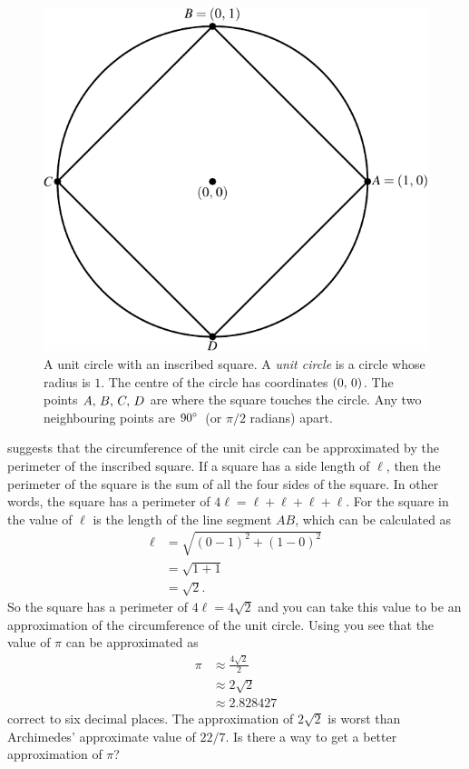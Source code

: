 \documentclass[a4paper,oneside,12pt]{article}
\begin{document}
\begin{figure}[!htbp]
\centering
\includegraphics[scale=1.1]{image/05/circle-square.pdf}
\caption{%
  A unit circle with an inscribed square.  A \emph{unit circle} is a
  circle whose radius is $1$.  The centre of the circle has
  coordinates $\left\lparen{0},\, {0}\right\rparen$.  The points ${A},\, {B},\, {C},\, {D}$ are
  where the square touches the circle.  Any two neighbouring points
  are ${90}^{\circ}$~(or $\pi / 2$ radians) apart.
}
\label{fig:circle_inscribed_square}
\end{figure}

 suggests that the circumference
of the unit circle can be approximated by the perimeter of the
inscribed square.  If a square has a side length of $\ell$, then the
perimeter of the square is the sum of all the four sides of the
square.  In other words, the square has a perimeter of
$4\ell = \ell + \ell + \ell + \ell$.  For the square in
 the value of $\ell$ is the length
of the line segment $AB$, which can be calculated as
\begin{align*}
\ell
&=
\sqrt{(0 - 1)^2 + (1 - 0)^2} \\[4pt]
&=
\sqrt{1 + 1} \\[4pt]
&=
\sqrt{2}.
\end{align*}
So the square has a perimeter of $4\ell = 4\sqrt{2}$ and you can take
this value to be an approximation of the circumference of the unit
circle.  Using  you see
that the value of $\pi$ can be approximated as
\begin{align*}
\pi
&\approx
\frac{4\sqrt{2}}{2} \\[4pt]
&\approx
2\sqrt{2} \\[4pt]
&\approx
2.828427
\end{align*}
correct to six decimal places.  The approximation of $2\sqrt{2}$ is
worst than Archimedes' approximate value of $22/7$.  Is there a way to
get a better approximation of $\pi$?
\end{document}
